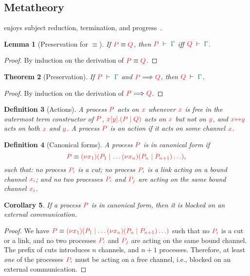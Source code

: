 \documentclass[copyright,creativecommons]{eptcs}
\newtheorem{lemma}{Lemma}[section]
\newtheorem{theorem}[lemma]{Theorem}
\newtheorem{corollary}[lemma]{Corollary}
\newtheorem{definition}[lemma]{Definition}
\begin{document}
\subsection{Metatheory}
\cp enjoys subject reduction, termination, and progress~\cite{wadler2012,lindley2015}.
\begin{lemma}[Preservation for $\equiv$]\label{lem:cp-preservation-equiv}
  If $\tm{P}\equiv\tm{Q}$, then $\seq[P]{\Gamma}$ iff $\seq[Q]{\Gamma}$.
\end{lemma} 
\begin{proof}
  By induction on the derivation of $\tm{P}\equiv\tm{Q}$.
\end{proof}
\begin{theorem}[Preservation]\label{thm:cp-preservation}
  If $\seq[P]{\Gamma}$ and $\reducesto{P}{Q}$, then $\seq[Q]{\Gamma}$.
\end{theorem} 
\begin{proof}
  By induction on the derivation of $\reducesto{P}{Q}$.
\end{proof}
\begin{definition}[Actions]
  A process $\tm{P}$ acts on $\tm{x}$ whenever $\tm{x}$ is free in the outermost
  term constructor of $\tm{P}$, \eg $\tm{\cpSend{x}{y}{P}{Q}}$ acts on $\tm{x}$
  but not on $\tm{y}$, and $\tm{\cpLink{x}{y}}$ acts on both $\tm{x}$ and $\tm{y}$.
  A process $\tm{P}$ is an action if it acts on some channel $\tm{x}$.
\end{definition}
\begin{definition}[Canonical forms]
  A process $\tm{P}$ is in canonical form if
  \[
    \tm{P} \equiv \tm{\cpCut{x_1}{P_1}{\dots\cpCut{x_n}{P_n}{P_{n+1}}\dots}},
  \]
  such that: no process $\tm{P_i}$ is a cut; no process $\tm{P_i}$ is a link acting on a bound channel $\tm{x_i}$; and no two processes $\tm{P_i}$ and $\tm{P_j}$ are acting on the same bound channel $\tm{x_i}$.
\end{definition}
\begin{corollary}
  If a process $\tm{P}$ is in canonical form, then it is blocked on an external communication.
\end{corollary}
\begin{proof}
  We have $\tm{P} \equiv \tm{\cpCut{x_1}{P_1}{\dots\cpCut{x_n}{P_n}{P_{n+1}}\dots}}$
  such that no $\tm{P_i}$ is a cut or a link, and no two processes $\tm{P_i}$ and $\tm{P_j}$ are acting on the same bound channel. The prefix of cuts introduces $n$ channels, and $n+1$ processes. Therefore, at least \emph{one} of the processes $\tm{P_i}$ must be acting on a free channel, i.e., blocked on an external communication.
\end{proof}
\end{document}
